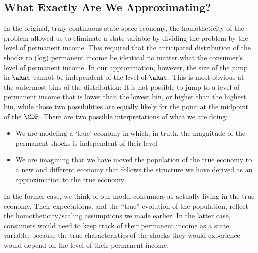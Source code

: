 \documentclass[../BufferStockTheory.tex]{subfiles}\usepackage{ApndxSteadyState}
\begin{document}
  \subsection{What Exactly Are We Approximating?}
  In the original, truly-continuous-state-space economy, the homotheticity of the problem allowed us to eliminate a state variable by dividing the problem by the level of permanent income.  This required that the anticipated distribution of the shocks to (log) permanent income be identical no matter what the consumer's level of permanent income.
  In our approximation, however, the size of the jump in $\point$ cannot be independent of the level of $\point$.  This is most obvious at the outermost bins of the distribution: It is not possible to jump to a level of permanent income that is lower than the lowest bin, or higher than the highest bin, while those two possibilities are equally likely for the point at the midpoint of the $\CDF$.  
  There are two possible interpretations of what we are doing:
  \begin{itemize}
  \item We are modeling a `true' economy in which, in truth, the magnitude of the permanent shocks is independent of their level
  \item We are imagining that we have moved the population of the true economy to a new and different economy that follows the structure we have derived as an approximation to the true economy
  \end{itemize}
  In the former case, we think of our model consumers as actually living in the true economy.  Their expectations, and the ``true'' evolution of the population, reflect the homotheticity/scaling assumptions we made earlier.  In the latter case, consumers would need to keep track of their permanent income as a state variable, because the true characteristics of the shocks they would experience would depend on the level of their permanent income.
  \pagebreak
\end{document}
